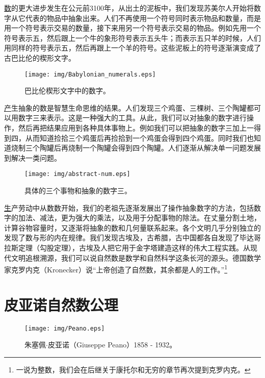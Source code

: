 \documentclass[UTF8]{article}
\begin{document}
\underline{数}的更大进步发生在公元前3100年，从出土的泥板中，我们发现苏美尔人开始将数字从它代表的物品中抽象出来。人们不再使用一个符号同时表示物品和数量，而是用一个符号表示交易的数量，接下来用另一个符号表示交易的物品。例如先用一个符号表示五，然后跟上一个牛的象形符号表示五头牛；而表示五只羊的时候，人们用同样的符号表示五，然后再跟上一个羊的符号。这些泥板上的符号逐渐演变成了古巴比伦的楔形文字。

\begin{figure}[htbp]
 \centering
 \texttt{[image: img/Babylonian\_numerals.eps]}
 \caption{巴比伦楔形文字中的数字\cite{wiki-babylonian-num}。}
 \label{fig:babylonian-num}
\end{figure}

\underline{产}生抽象的数是智慧生命思维的结果。人们发现三个鸡蛋、三棵树、三个陶罐都可以用数字三来表示。这是一种强大的工具。从此，我们可以对抽象的数字进行操作，然后再把结果应用到各种具体事物上。例如我们可以把抽象的数字三加上一得到四，从而知道捡拾三个鸡蛋后再捡拾到一个鸡蛋会得到四个鸡蛋。同时我们也知道烧制三个陶罐后再烧制一个陶罐会得到四个陶罐。人们逐渐从解决单一问题发展到解决一类问题。

\begin{figure}[htbp]
 \centering
 \texttt{[image: img/abstract-num.eps]}
 \caption{具体的三个事物和抽象的数字三。}
 \label{fig:abstract-num}
\end{figure}

\underline{生}产劳动中从数数开始，我们的老祖先逐渐发展出了操作抽象数字的方法，包括数字的加法、减法，更为强大的乘法，以及用于分配事物的除法。在丈量分割土地，计算谷物容量时，又逐渐将抽象的数和几何量联系起来。各个文明几乎分别独立的发现了数与形的内在规律。我们发现古埃及，古希腊，古中国都各自发现了毕达哥拉斯定理（勾股定理），古埃及人把它用于金字塔建造这样的伟大工程实践。从现代文明追根溯源，我们可以说自然数是数学和自然科学这条长河的源头。德国数学家克罗内克（Kronecker）说“上帝创造了自然数，其余都是人的工作。”\footnote{一说为整数，我们会在后继关于康托尔和无穷的章节再次提到克罗内克。}

\section{皮亚诺自然数公理}

\begin{figure}[htbp]
 \centering
 \texttt{[image: img/Peano.eps]}
 \caption{朱塞佩$\cdot$皮亚诺（Giuseppe Peano）1858 - 1932。}
 \label{fig:abstract-num}
\end{figure}
\end{document}
